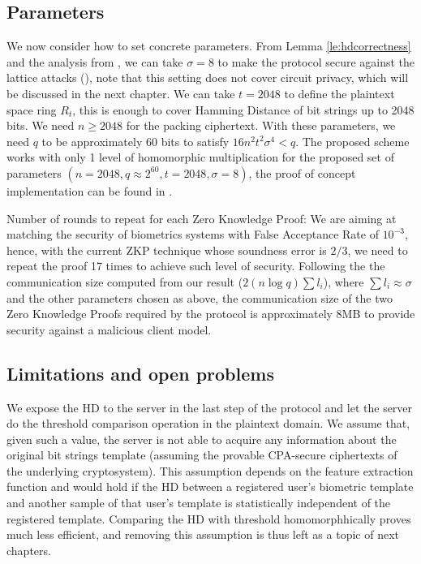 \subsection{Parameters}
\label{sec:parameters}
We now consider how to set concrete parameters. From Lemma
\ref{le:hdcorrectness} and the analysis from \cite{naehrig2011can}, we can take
\(\sigma = 8\) to make the protocol secure against the lattice attacks
(\cite{micciancio2008lattice}), note that this setting does not cover circuit
privacy, which will be discussed in the next chapter. We can take \(t = 2048\)
to define the plaintext space ring \(R_{t}\), this is enough to cover Hamming
Distance of bit strings up to 2048 bits. We need \(n \geq 2048\) for the packing
ciphertext. With these parameters, we need \(q\) to be approximately 60 bits to
satisfy \(16n^{2}t^{2}\sigma^{4} < q\).  The proposed scheme works with only 1
level of homomorphic multiplication for the proposed set of parameters
$(n = 2048, q \approx 2^{60}, t = 2048, \sigma = 8)$, the proof of concept
implementation can be found in \cite{rimrimrq38:online}.

Number of rounds to repeat for each Zero Knowledge Proof: We are aiming at
matching the security of biometrics systems with False Acceptance Rate of
$10^{-3}$, hence, with the current ZKP technique whose soundness error is
$2/3$, we need to repeat the proof 17 times to achieve such level of
security. Following the the communication size computed from our result
($2(n\log q)\sum{l_{i}}$), where $\sum{l_{i}} \approx \sigma$ and the other
parameters chosen as above, the communication size of the two Zero Knowledge
Proofs required by the protocol is approximately 8MB to provide security against
a malicious client model.

\subsection{Limitations and open problems}
\label{sec:limitations}
We expose the HD to the server in the last step of the protocol and let the
server do the threshold comparison operation in the plaintext domain. We assume
that, given such a value, the server is not able to acquire any
information about the original bit strings template (assuming the provable
CPA-secure ciphertexts of the underlying cryptosystem). This assumption depends on the feature extraction function and would hold if the HD between a registered user's biometric template and another sample of that user's template is statistically independent of the registered template. Comparing the HD with threshold
homomorphhically proves much less efficient, and removing this assumption is
thus left as a topic of next chapters.

